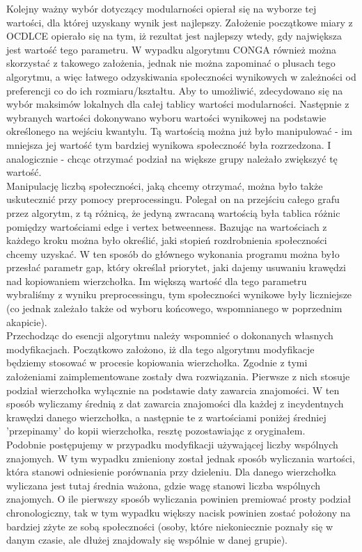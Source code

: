 \documentclass{article}
\begin{document}
Kolejny ważny wybór dotyczący modularności opierał się na wyborze tej wartości, dla której uzyskany wynik jest najlepszy. Założenie początkowe miary z OCDLCE opierało się na tym, iż rezultat jest najlepszy wtedy, gdy największa jest wartość tego parametru. W wypadku algorytmu CONGA również można skorzystać z takowego założenia, jednak nie można zapominać o plusach tego algorytmu, a więc łatwego odzyskiwania społeczności wynikowych w zależności od preferencji co do ich rozmiaru/kształtu. Aby to umożliwić, zdecydowano się na wybór maksimów lokalnych dla całej tablicy wartości modularności. Następnie z wybranych wartości dokonywano wyboru wartości wynikowej na podstawie określonego na wejściu kwantylu. Tą wartością można już było manipulować - im mniejsza jej wartość tym bardziej wynikowa społeczność była rozrzedzona. I analogicznie - chcąc otrzymać podział na większe grupy należało zwiększyć tę wartość.\\

Manipulację liczbą społeczności, jaką chcemy otrzymać, można było także uskutecznić przy pomocy preprocessingu. Polegał on na przejściu całego grafu przez algorytm, z tą różnicą, że jedyną zwracaną wartością była tablica różnic pomiędzy wartościami edge i vertex betweenness. Bazując na wartościach z każdego kroku można było określić, jaki stopień rozdrobnienia społeczności chcemy uzyskać. W ten sposób do głównego wykonania programu można było przesłać parametr gap, który określał priorytet, jaki dajemy usuwaniu krawędzi nad kopiowaniem wierzchołka. Im większą wartość dla tego parametru wybraliśmy z wyniku preprocessingu, tym społeczności wynikowe były liczniejsze (co jednak zależało także od wyboru końcowego, wspomnianego w poprzednim akapicie).\\

Przechodząc do esencji algorytmu należy wspomnieć o dokonanych własnych modyfikacjach. Początkowo założono, iż dla tego algorytmu modyfikacje będziemy stosować w procesie kopiowania wierzchołka. Zgodnie z tymi założeniami zaimplementowane zostały dwa rozwiązania. Pierwsze z nich stosuje podział wierzchołka wyłącznie na podstawie daty zawarcia znajomości. W ten sposób wyliczamy średnią z dat zawarcia znajomości dla każdej z incydentnych krawędzi danego wierzchołka, a następnie te z wartościami poniżej średniej 'przepinamy' do kopii wierzchołka, resztę pozostawiając z oryginałem.\\

Podobnie postępujemy w przypadku modyfikacji używającej liczby wspólnych znajomych. W tym wypadku zmieniony został jednak sposób wyliczania wartości, która stanowi odniesienie porównania przy dzieleniu. Dla danego wierzchołka wyliczana jest tutaj średnia ważona, gdzie wagę stanowi liczba wspólnych znajomych. O ile pierwszy sposób wyliczania powinien premiować prosty podział chronologiczny, tak w tym wypadku większy nacisk powinien zostać położony na bardziej zżyte ze sobą społeczności (osoby, które niekoniecznie poznały się w danym czasie, ale dłużej znajdowały się wspólnie w danej grupie).\\
\end{document}
